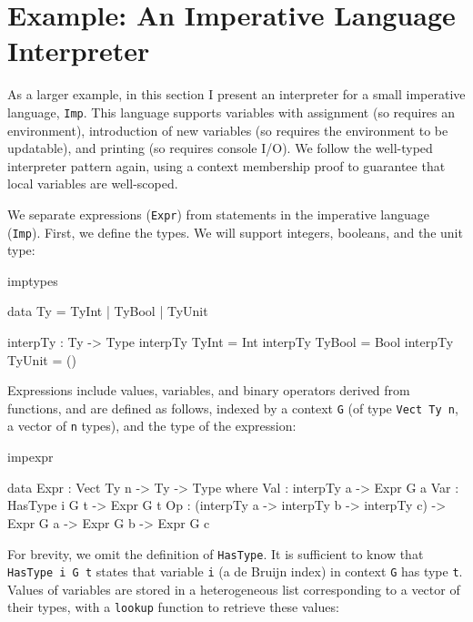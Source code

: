 \section{Example: An Imperative Language Interpreter}

\newcommand{\Imp}{\texttt{Imp}}

\label{sect:impint}

As a larger example, in this section I present an interpreter for 
a small imperative language, \Imp{}. This language supports variables
with assignment (so requires an environment), introduction of new
variables (so requires the environment to be updatable), 
and printing (so requires console I/O).
We follow the well-typed interpreter pattern again, using a context membership
proof to guarantee that local variables are well-scoped. 

We separate expressions (\texttt{Expr}) from statements in the imperative
language (\texttt{Imp}). First, we define the types. We will support integers,
booleans, and the unit type:

\begin{SaveVerbatim}{imptypes}

data Ty = TyInt | TyBool | TyUnit 

interpTy : Ty -> Type
interpTy TyInt  = Int
interpTy TyBool = Bool
interpTy TyUnit = ()

\end{SaveVerbatim}

\noindent
Expressions include values, variables, and binary operators derived from 
\Idris{} functions, and are defined as follows, indexed by a context
\texttt{G} (of type \texttt{Vect Ty n}, a vector of \texttt{n} types),
and the type of the expression:

\begin{SaveVerbatim}{impexpr}

data Expr : Vect Ty n -> Ty -> Type where
     Val : interpTy a -> Expr G a
     Var : HasType i G t -> Expr G t
     Op  : (interpTy a -> interpTy b -> interpTy c) ->
            Expr G a -> Expr G b -> Expr G c

\end{SaveVerbatim}

\noindent
For brevity, we omit the definition of \texttt{HasType}. It is sufficient to
know that \texttt{HasType i G t} states that variable \texttt{i} (a de Bruijn
index) in context \texttt{G} has type \texttt{t}.
Values of variables are stored in a heterogeneous list
corresponding to a vector of their types, with a \texttt{lookup} function
to retrieve these values:

